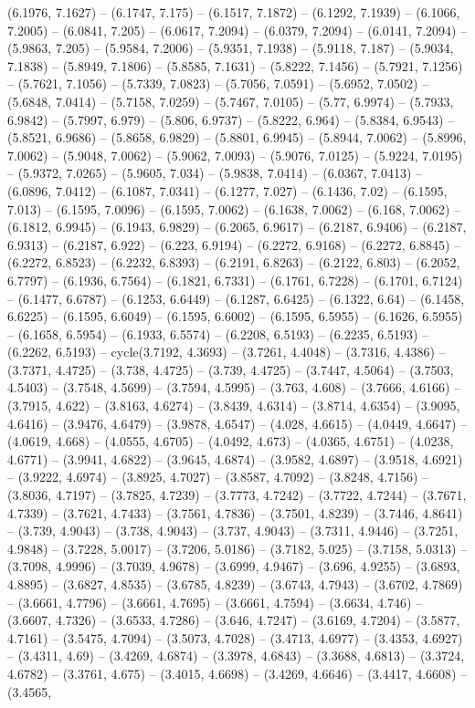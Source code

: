 (6.1976, 7.1627) -- (6.1747, 7.175) -- (6.1517, 7.1872) -- (6.1292, 7.1939) -- (6.1066, 7.2005) -- (6.0841, 7.205) -- (6.0617, 7.2094) -- (6.0379, 7.2094) -- (6.0141, 7.2094) -- (5.9863, 7.205) -- (5.9584, 7.2006) -- (5.9351, 7.1938) -- (5.9118, 7.187) -- (5.9034, 7.1838) -- (5.8949, 7.1806) -- (5.8585, 7.1631) -- (5.8222, 7.1456) -- (5.7921, 7.1256) -- (5.7621, 7.1056) -- (5.7339, 7.0823) -- (5.7056, 7.0591) -- (5.6952, 7.0502) -- (5.6848, 7.0414) -- (5.7158, 7.0259) -- (5.7467, 7.0105) -- (5.77, 6.9974) -- (5.7933, 6.9842) -- (5.7997, 6.979) -- (5.806, 6.9737) -- (5.8222, 6.964) -- (5.8384, 6.9543) -- (5.8521, 6.9686) -- (5.8658, 6.9829) -- (5.8801, 6.9945) -- (5.8944, 7.0062) -- (5.8996, 7.0062) -- (5.9048, 7.0062) -- (5.9062, 7.0093) -- (5.9076, 7.0125) -- (5.9224, 7.0195) -- (5.9372, 7.0265) -- (5.9605, 7.034) -- (5.9838, 7.0414) -- (6.0367, 7.0413) -- (6.0896, 7.0412) -- (6.1087, 7.0341) -- (6.1277, 7.027) -- (6.1436, 7.02) -- (6.1595, 7.013) -- (6.1595, 7.0096) -- (6.1595, 7.0062) -- (6.1638, 7.0062) -- (6.168, 7.0062) -- (6.1812, 6.9945) -- (6.1943, 6.9829) -- (6.2065, 6.9617) -- (6.2187, 6.9406) -- (6.2187, 6.9313) -- (6.2187, 6.922) -- (6.223, 6.9194) -- (6.2272, 6.9168) -- (6.2272, 6.8845) -- (6.2272, 6.8523) -- (6.2232, 6.8393) -- (6.2191, 6.8263) -- (6.2122, 6.803) -- (6.2052, 6.7797) -- (6.1936, 6.7564) -- (6.1821, 6.7331) -- (6.1761, 6.7228) -- (6.1701, 6.7124) -- (6.1477, 6.6787) -- (6.1253, 6.6449) -- (6.1287, 6.6425) -- (6.1322, 6.64) -- (6.1458, 6.6225) -- (6.1595, 6.6049) -- (6.1595, 6.6002) -- (6.1595, 6.5955) -- (6.1626, 6.5955) -- (6.1658, 6.5954) -- (6.1933, 6.5574) -- (6.2208, 6.5193) -- (6.2235, 6.5193) -- (6.2262, 6.5193) -- cycle(3.7192, 4.3693) -- (3.7261, 4.4048) -- (3.7316, 4.4386) -- (3.7371, 4.4725) -- (3.738, 4.4725) -- (3.739, 4.4725) -- (3.7447, 4.5064) -- (3.7503, 4.5403) -- (3.7548, 4.5699) -- (3.7594, 4.5995) -- (3.763, 4.608) -- (3.7666, 4.6166) -- (3.7915, 4.622) -- (3.8163, 4.6274) -- (3.8439, 4.6314) -- (3.8714, 4.6354) -- (3.9095, 4.6416) -- (3.9476, 4.6479) -- (3.9878, 4.6547) -- (4.028, 4.6615) -- (4.0449, 4.6647) -- (4.0619, 4.668) -- (4.0555, 4.6705) -- (4.0492, 4.673) -- (4.0365, 4.6751) -- (4.0238, 4.6771) -- (3.9941, 4.6822) -- (3.9645, 4.6874) -- (3.9582, 4.6897) -- (3.9518, 4.6921) -- (3.9222, 4.6974) -- (3.8925, 4.7027) -- (3.8587, 4.7092) -- (3.8248, 4.7156) -- (3.8036, 4.7197) -- (3.7825, 4.7239) -- (3.7773, 4.7242) -- (3.7722, 4.7244) -- (3.7671, 4.7339) -- (3.7621, 4.7433) -- (3.7561, 4.7836) -- (3.7501, 4.8239) -- (3.7446, 4.8641) -- (3.739, 4.9043) -- (3.738, 4.9043) -- (3.737, 4.9043) -- (3.7311, 4.9446) -- (3.7251, 4.9848) -- (3.7228, 5.0017) -- (3.7206, 5.0186) -- (3.7182, 5.025) -- (3.7158, 5.0313) -- (3.7098, 4.9996) -- (3.7039, 4.9678) -- (3.6999, 4.9467) -- (3.696, 4.9255) -- (3.6893, 4.8895) -- (3.6827, 4.8535) -- (3.6785, 4.8239) -- (3.6743, 4.7943) -- (3.6702, 4.7869) -- (3.6661, 4.7796) -- (3.6661, 4.7695) -- (3.6661, 4.7594) -- (3.6634, 4.746) -- (3.6607, 4.7326) -- (3.6533, 4.7286) -- (3.646, 4.7247) -- (3.6169, 4.7204) -- (3.5877, 4.7161) -- (3.5475, 4.7094) -- (3.5073, 4.7028) -- (3.4713, 4.6977) -- (3.4353, 4.6927) -- (3.4311, 4.69) -- (3.4269, 4.6874) -- (3.3978, 4.6843) -- (3.3688, 4.6813) -- (3.3724, 4.6782) -- (3.3761, 4.675) -- (3.4015, 4.6698) -- (3.4269, 4.6646) -- (3.4417, 4.6608) -- (3.4565, 